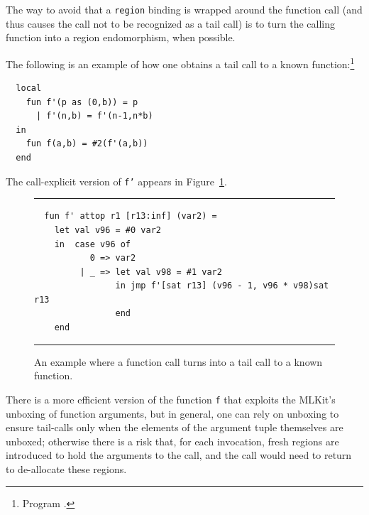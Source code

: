 \documentclass[12pt]{book}
\begin{document}
The way to avoid that a {\tt region} binding is wrapped around
the function call (and thus causes the call not to be recognized as a
tail call) is to turn the calling function into a region endomorphism,
when possible.

The following is an example of how one obtains a tail call to a known
function:\footnote{Program .}
\begin{verbatim}
  local
    fun f'(p as (0,b)) = p
      | f'(n,b) = f'(n-1,n*b)
  in
    fun f(a,b) = #2(f'(a,b))
  end
\end{verbatim}
The call-explicit version of {\tt f'} appears in
Figure~\ref{tail.fig}.
\begin{figure}
\hrule \medskip
\begin{verbatim}
  fun f' attop r1 [r13:inf] (var2) =
    let val v96 = #0 var2
    in  case v96 of
           0 => var2
         | _ => let val v98 = #1 var2
                in jmp f'[sat r13] (v96 - 1, v96 * v98)sat r13
                end
    end
\end{verbatim}
\caption{An example where a function call turns into a tail call to a known function.}
\medskip \hrule
\label{tail.fig}
\end{figure}

There is a more efficient version of the function {\tt f} that
exploits the MLKit's unboxing of function arguments, but in general, one
can rely on unboxing to ensure tail-calls only when the elements of
the argument tuple themselves are unboxed; otherwise there is a risk
that, for each invocation, fresh regions are introduced to hold the
arguments to the call, and the call would need to return to
de-allocate these regions.
\end{document}

